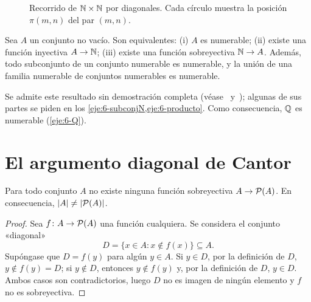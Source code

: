 \begin{figure}[h]
\centering
{}
\caption{Recorrido de $\mathbb{N}\times\mathbb{N}$ por diagonales. Cada círculo muestra la posición $\pi(m,n)$ del par $(m,n)$.}
\label{fig:t6-cantor}
\end{figure}

\begin{proposicion}\label{prop:t6-criterios}
Sea $A$ un conjunto no vacío. Son equivalentes: (i) $A$ es numerable; (ii) existe una función inyectiva $A\to\mathbb{N}$; (iii) existe una función sobreyectiva $\mathbb{N}\to A$. Además, todo subconjunto de un conjunto numerable es numerable, y la unión de una familia numerable de conjuntos numerables es numerable.
\end{proposicion}

Se admite este resultado sin demostración completa (véase~\cite[§14.2]{hammack} y~\cite[§8.2]{velleman}); algunas de sus partes se piden en los \cref{eje:6-subconjN,eje:6-producto}. Como consecuencia, $\mathbb{Q}$ es numerable (\cref{eje:6-Q}).

\section{El argumento diagonal de Cantor}

\begin{teorema}[Cantor]\label{teo:t6-cantor}
Para todo conjunto $A$ no existe ninguna función sobreyectiva $A\to\mathcal{P}(A)$. En consecuencia, $\lvert A\rvert\neq\lvert\mathcal{P}(A)\rvert$.
\end{teorema}

\begin{proof}
Sea $f\colon A\to\mathcal{P}(A)$ una función cualquiera. Se considera el conjunto «diagonal»
\[
D=\{x\in A: x\notin f(x)\}\subseteq A.
\]
Supóngase que $D=f(y)$ para algún $y\in A$. Si $y\in D$, por la definición de $D$, $y\notin f(y)=D$; si $y\notin D$, entonces $y\notin f(y)$ y, por la definición de $D$, $y\in D$. Ambos casos son contradictorios, luego $D$ no es imagen de ningún elemento y $f$ no es sobreyectiva.
\end{proof}


